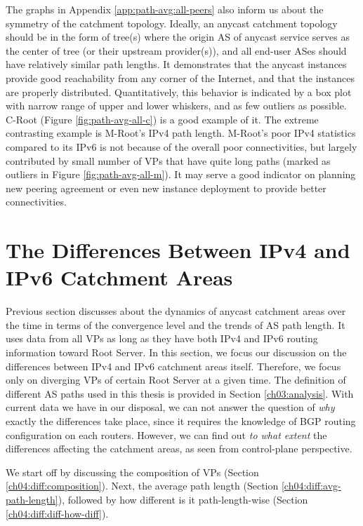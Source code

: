 The graphs in Appendix \ref{app:path-avg:all-peers} also inform us about the symmetry of the catchment topology. Ideally, an anycast catchment topology should be in the form of tree(s) where the origin AS of anycast service serves as the center of tree (or their upstream provider(s)), and all end-user ASes should have relatively similar path lengths. It demonstrates that the anycast instances provide good reachability from any corner of the Internet, and that the instances are properly distributed. Quantitatively, this behavior is indicated by a box plot with narrow range of upper and lower whiskers, and as few outliers as possible. C-Root (Figure \ref{fig:path-avg-all-c}) is a good example of it. The extreme contrasting example is M-Root's IPv4 path length. M-Root's poor IPv4 statistics compared to its IPv6 is not because of the overall poor connectivities, but largely contributed by small number of VPs that have quite long paths (marked as outliers in Figure \ref{fig:path-avg-all-m}). It may serve a good indicator on planning new peering agreement or even new instance deployment to provide better connectivities.  



\section{The Differences Between IPv4 and IPv6 Catchment Areas}
\label{ch04:differences}
Previous section discusses about the dynamics of anycast catchment areas over the time in terms of the convergence level and the trends of AS path length. It uses data from all VPs as long as they have both IPv4 and IPv6 routing information toward Root Server. In this section, we focus our discussion on the differences between IPv4 and IPv6 catchment areas itself. Therefore, we focus only on diverging VPs of certain Root Server at a given time. The definition of different AS paths used in this thesis is provided in Section \ref{ch03:analysis}. With current data we have in our disposal, we can not answer the question of \textit{why} exactly the differences take place, since it requires the knowledge of BGP routing configuration on each routers. However, we can find out \textit{to what extent} the differences affecting the catchment areas, as seen from control-plane perspective. 

We start off by discussing the composition of VPs (Section \ref{ch04:diff:composition}). Next, the average path length (Section \ref{ch04:diff:avg-path-length}), followed by how different is it path-length-wise (Section \ref{ch04:diff:diff-how-diff}).

